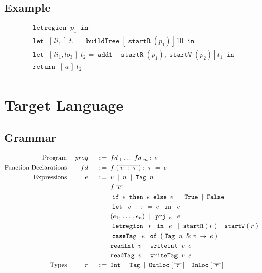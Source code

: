 \documentclass[12pt]{article}
\newcommand{\gramdef}{\; ::= \;}
\newcommand{\gramor}{\; | \;}
\newcommand{\PROG}{\keywd{prog}}
\newcommand{\EXPR}{\keywd{e}}
\newcommand{\TYP}{\keywd{\tau}}
\newcommand{\FD}{\keywd{fd}}
\newcommand{\keywd}[1]{\; {#1} \;}
\newcommand{\gramwd}[1]{\; \texttt{#1} \;}
\newcommand{\var}{\; \svar \;}
\newcommand{\svar}{v}
\newcommand{\fvar}{\; \sfvar \;}
\newcommand{\sfvar}{f}
\newcommand{\num}{\; n \;}
\newcommand{\letexpr}[3]{\;\gramwd{let} \; #1 = #2 \; \gramwd{in} \; #3 \;}
\newcommand{\ife}[3]{\; \gramwd{if}#1\gramwd{then}#2\gramwd{else}#3 \;}
\newcommand{\returnb}[2]{\; & \gramwd{return}\; [\,#1\,]\;#2\;& \\}
\newcommand{\project}[2]{\; \gramwd{prj}_{#1}\,{#2}\;}
\newcommand{\letlexprb}[4]{\;&\gramwd{let}\; [\,#1\,]\; #2 = #3 \; \gramwd{in}& \; \\ #4 \;}
\newcommand{\letregion}[2]{\; \gramwd{letregion}\;#1\; \gramwd{in}\; #2 \;}
\newcommand{\letregionb}[2]{\; & \gramwd{letregion}\; #1\; \gramwd{in}\;& \\ #2 \;}
\newcommand{\REG}{\keywd{r}}
\newcommand{\casetag}[3]{\; \gramwd{caseTag}\;#1\;\gramwd{of}\;(#2 \rightarrow #3)\;}
\begin{document}
\subsection{Example}
\begin{displaymath}
\begin{aligned}
\letregionb{p_1}
  {\letlexprb{li_1}{t_1}{\gramwd{buildTree}[\gramwd{startR}(p_1)] 10}
    {\letlexprb{li_1,lo_3}{t_2}{\gramwd{add1}[\gramwd{startR}(p_1),\gramwd{startW}(p_2)] t_1}
      {\returnb{a}{t_2}}}}
\end{aligned}
\end{displaymath}

\section{Target Language}
\subsection{Grammar}
\begin{displaymath}
  \begin{aligned}
      \textup{Program} && \PROG && \gramdef & \FD_1 \ldots \FD_m \; ; \EXPR \\
      \textup{Function Declarations} && \FD && \gramdef & \fvar(\overline{\var:\TYP}) : \TYP = \EXPR \\
      \textup{Expressions} && \EXPR && \gramdef & \var \gramor \num \gramor \gramwd{Tag}\num \\
      && && \gramor & \fvar \overline{\EXPR} \\
      && && \gramor & \ife{\EXPR}{\EXPR}{\EXPR} \gramor \gramwd{True} \gramor \gramwd{False} \\
      && && \gramor & \letexpr{\var:\TYP}{\EXPR}{\EXPR} \\
      && && \gramor & \;(e_1,\, \dots\, , e_n)\; \gramor \project{\num}{\EXPR} \\
      && && \gramor & \letregion{\REG}{\EXPR} \gramor \gramwd{startR}(\REG) \gramor \gramwd{startW}(\REG) \\
      && && \gramor & \casetag{\EXPR}{\gramwd{Tag}\num \;\& \var}{\EXPR} \\
      && && \gramor & \gramwd{readInt} \var \gramor \gramwd{writeInt} \var \EXPR \\
      && && \gramor & \gramwd{readTag} \var \gramor \gramwd{writeTag} \var \EXPR \\
      \textup{Types} && \TYP && \gramdef & \gramwd{Int} \gramor \gramwd{Tag} \gramor \gramwd{OutLoc} [\,\overline{\TYP}\,] \gramor \gramwd{InLoc} [\,\overline{\TYP}\,]
  \end{aligned}
\end{displaymath}
\end{document}
